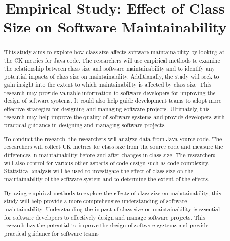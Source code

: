 \documentclass[conference]{IEEEtran}
\begin{document}
	
	\title{Empirical Study: Effect of Class Size on Software Maintainability}
	\author{
		\and
		}
	
	\maketitle
	
	\begin{abstract}
		This study aims to explore how class size affects software maintainability by looking at the CK metrics for Java code. The researchers will use empirical methods to examine the relationship between class size and software maintainability and to identify any potential impacts of class size on maintainability. Additionally, the study will seek to gain insight into the extent to which maintainability is affected by class size. This research may provide valuable information to software developers for improving the design of software systems. It could also help guide development teams to adopt more effective strategies for designing and managing software projects. Ultimately, this research may help improve the quality of software systems and provide developers with practical guidance in designing and managing software projects.
		
		To conduct the research, the researchers will analyze data from Java source code. The researchers will collect CK metrics for class size from the source code and measure the differences in maintainability before and after changes in class size. The researchers will also control for various other aspects of code design such as code complexity. Statistical analysis will be used to investigate the effect of class size on the maintainability of the software system and to determine the extent of the effects.
		
		By using empirical methods to explore the effects of class size on maintainability, this study will help provide a more comprehensive understanding of software maintainability. Understanding the impact of class size on maintainability is essential for software developers to effectively design and manage software projects. This research has the potential to improve the design of software systems and provide practical guidance for software teams.
	\end{abstract}
	
\end{document}
